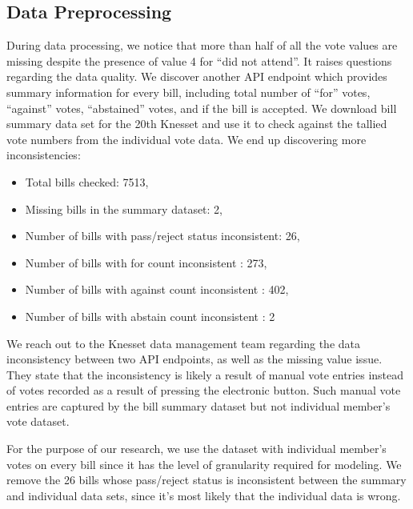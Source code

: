 \subsection{Data Preprocessing}

During data processing, we notice that more than half of all the vote values
are missing despite the presence of value 4 for ``did not attend''.
It raises questions regarding the data quality.
We discover another API endpoint which provides summary information for
every bill, including total number of ``for'' votes, ``against'' votes,
``abstained'' votes, and if the bill is accepted.
We download bill summary data set for the 20th Knesset and use it
to check against the tallied vote numbers from the individual vote data.
We end up discovering more inconsistencies:

\begin{itemize}
  \item Total bills checked: 7513,
  \item Missing bills in the summary dataset: 2,
  \item Number of bills with pass/reject status inconsistent: 26,
  \item Number of bills with for count inconsistent : 273,
  \item Number of bills with against count inconsistent : 402,
  \item Number of bills with abstain count inconsistent : 2
\end{itemize}

We reach out to the Knesset data management team regarding the data inconsistency between
two API endpoints, as well as the missing value issue.
They state that the inconsistency
is likely a result of manual vote entries instead of votes recorded
as a result of pressing the electronic button.
Such manual vote entries are captured by the bill summary dataset
but not individual member's vote dataset.

For the purpose of our research, we use the dataset with individual member's
votes on every bill since it has the level of granularity required for modeling.
We remove the 26 bills whose pass/reject status is inconsistent between
the summary and individual data sets, since it's most likely that
the individual data is wrong.


